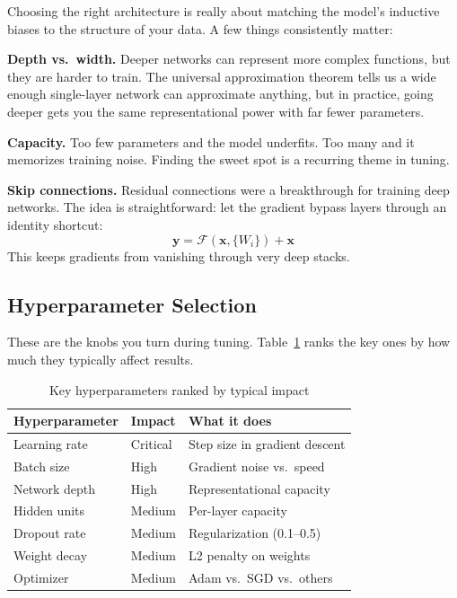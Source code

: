 \documentclass[12pt, letterpaper]{article}
\begin{document}
Choosing the right architecture is really about matching the model's inductive biases to the structure of your data. A few things consistently matter:

\textbf{Depth vs.\ width.} Deeper networks can represent more complex functions, but they are harder to train. The universal approximation theorem tells us a wide enough single-layer network can approximate anything, but in practice, going deeper gets you the same representational power with far fewer parameters.

\textbf{Capacity.} Too few parameters and the model underfits. Too many and it memorizes training noise. Finding the sweet spot is a recurring theme in tuning.

\textbf{Skip connections.} Residual connections \cite{he2016deep} were a breakthrough for training deep networks. The idea is straightforward: let the gradient bypass layers through an identity shortcut:
\begin{equation}
    \mathbf{y} = \mathcal{F}(\mathbf{x}, \{W_i\}) + \mathbf{x}
\end{equation}
This keeps gradients from vanishing through very deep stacks.

\subsection{Hyperparameter Selection}

These are the knobs you turn during tuning. Table~\ref{tab:hyperparams} ranks the key ones by how much they typically affect results.

\begin{table}[H]
\centering
\small
\caption{Key hyperparameters ranked by typical impact}
\label{tab:hyperparams}
\begin{tabular}{@{}llp{5cm}@{}}
\toprule
\textbf{Hyperparameter} & \textbf{Impact} & \textbf{What it does} \\
\midrule
Learning rate & Critical & Step size in gradient descent \\
Batch size    & High     & Gradient noise vs.\ speed \\
Network depth & High     & Representational capacity \\
Hidden units  & Medium   & Per-layer capacity \\
Dropout rate  & Medium   & Regularization (0.1--0.5) \\
Weight decay  & Medium   & L2 penalty on weights \\
Optimizer     & Medium   & Adam vs.\ SGD vs.\ others \\
\bottomrule
\end{tabular}
\end{table}
\end{document}

